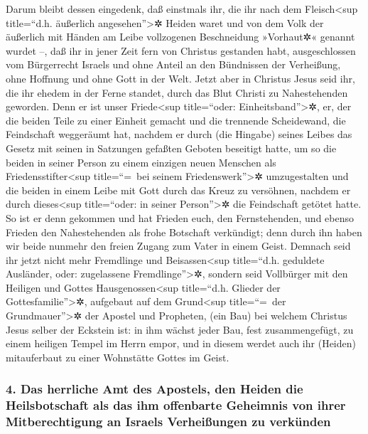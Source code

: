  Darum bleibt dessen eingedenk, daß einstmals ihr, die
ihr nach dem Fleisch\textless sup title=``d.h. äußerlich
angesehen''\textgreater✲ Heiden waret und von dem Volk der äußerlich mit
Händen am Leibe vollzogenen Beschneidung »Vorhaut✲« genannt wurdet --,
 daß ihr in jener Zeit fern von Christus gestanden habt,
ausgeschlossen vom Bürgerrecht Israels und ohne Anteil an den Bündnissen
der Verheißung, ohne Hoffnung und ohne Gott in der Welt. 
Jetzt aber in Christus Jesus seid ihr, die ihr ehedem in der Ferne
standet, durch das Blut Christi zu Nahestehenden geworden.
 Denn er ist unser Friede\textless sup title=``oder:
Einheitsband''\textgreater✲, er, der die beiden Teile zu einer Einheit
gemacht und die trennende Scheidewand, die Feindschaft weggeräumt hat,
nachdem er durch (die Hingabe) seines Leibes  das Gesetz
mit seinen in Satzungen gefaßten Geboten beseitigt hatte, um so die
beiden in seiner Person zu einem einzigen neuen Menschen als
Friedensstifter\textless sup title=``=~bei seinem
Friedenswerk''\textgreater✲ umzugestalten  und die beiden
in einem Leibe mit Gott durch das Kreuz zu versöhnen, nachdem er durch
dieses\textless sup title=``oder: in seiner Person''\textgreater✲ die
Feindschaft getötet hatte.  So ist er denn gekommen und
hat Frieden euch, den Fernstehenden, und ebenso Frieden den
Nahestehenden als frohe Botschaft verkündigt;  denn durch
ihn haben wir beide nunmehr den freien Zugang zum Vater in einem Geist.
 Demnach seid ihr jetzt nicht mehr Fremdlinge und
Beisassen\textless sup title=``d.h. geduldete Ausländer, oder:
zugelassene Fremdlinge''\textgreater✲, sondern seid Vollbürger mit den
Heiligen und Gottes Hausgenossen\textless sup title=``d.h. Glieder der
Gottesfamilie''\textgreater✲,  aufgebaut auf dem
Grund\textless sup title=``=~der Grundmauer''\textgreater✲ der Apostel
und Propheten, (ein Bau) bei welchem Christus Jesus selber der Eckstein
ist:  in ihm wächst jeder Bau, fest zusammengefügt, zu
einem heiligen Tempel im Herrn empor,  und in diesem
werdet auch ihr (Heiden) mitauferbaut zu einer Wohnstätte Gottes im
Geist.

\hypertarget{das-herrliche-amt-des-apostels-den-heiden-die-heilsbotschaft-als-das-ihm-offenbarte-geheimnis-von-ihrer-mitberechtigung-an-israels-verheiuxdfungen-zu-verkuxfcnden}{%
\subsubsection{4. Das herrliche Amt des Apostels, den Heiden die
Heilsbotschaft als das ihm offenbarte Geheimnis von ihrer
Mitberechtigung an Israels Verheißungen zu
verkünden}\label{das-herrliche-amt-des-apostels-den-heiden-die-heilsbotschaft-als-das-ihm-offenbarte-geheimnis-von-ihrer-mitberechtigung-an-israels-verheiuxdfungen-zu-verkuxfcnden}}

